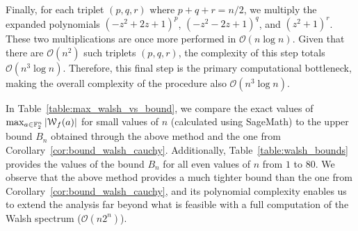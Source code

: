 \documentclass[11pt]{llncs}
\begin{document}
Finally, for each triplet $(p,q,r)$ where $p+q+r=n/2$, we multiply the expanded polynomials $(-z^2 + 2z + 1)^p$, $(-z^2 - 2z + 1)^q$, and $(z^2 + 1)^r$. These two multiplications are once more performed in $\mathcal{O}(n \log n)$. Given that there are $\mathcal{O}(n^2)$ such triplets $(p,q,r)$, the complexity of this step totals $\mathcal{O}(n^3 \log n)$. Therefore, this final step is the primary computational bottleneck, making the overall complexity of the procedure also $\mathcal{O}(n^3 \log n)$.






In Table~\ref{table:max_walsh_vs_bound}, we compare the exact values of $\max_{a\in\mathbb F_2^n}|\mathcal W_{f}(a)|$ for small values of $n$ (calculated using \textsf{SageMath}) to the upper bound $B_n$ obtained through the above method and the one from Corollary~\ref{cor:bound_walsh_cauchy}. 
Additionally, Table~\ref{table:walsh_bounds} provides the values of the bound $B_n$ for all even values of $n$ from $1$ to $80$.
We observe that the above method provides a much tighter bound than the one from Corollary~\ref{cor:bound_walsh_cauchy}, and its polynomial complexity enables us to extend the analysis far beyond what is feasible with a full computation of the Walsh spectrum (\( \mathcal{O}(n 2^n) \)).
\end{document}
